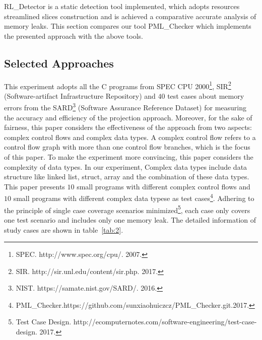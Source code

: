 RL\_Detector is a static detection tool implemented, which adopts resources streamlined slices construction and is achieved a comparative accurate analysis of memory leaks. This section compares our tool PML\_Checker which implements the presented approach with the above tools.
\subsection{Selected Approaches}\label{ssec:ca}
This experiment adopts all the C programs from SPEC CPU 2000\footnote{SPEC. http://www.spec.org/cpu/. 2007.}, SIR\footnote{SIR. http://sir.unl.edu/content/sir.php. 2017.} (Software-artifact Infrastructure Repository) and $40$ test cases about memory errors from the SARD\footnote{NIST. https://samate.nist.gov/SARD/. 2016.} (Software Assurance Reference Dataset) for measuring the accuracy and efficiency of the projection approach. Moreover, for the sake of fairness, this paper considers the effectiveness of the approach from two aspects: complex control flows and complex data types. A complex control flow refers to a control flow graph with more than one control flow branches, which is the focus of this paper. To make the experiment more convincing, this paper considers the complexity of data types. In our experiment, Complex data types include data structure like linked list, struct, array and the combination of these data types. This paper presents $10$ small programs with different complex control flows and $10$ small programs with different complex data typese as test cases\protect\footnote{PML\_Checker.https://github.com/sunxiaohuiczcz/PML\_Checker.git.2017.}. Adhering to the principle of single case coverage scenarios minimized\footnote{Test Case Design. http://ecomputernotes.com/software-engineering/test-case-design. 2017.}, each case only covers one test scenario and includes only one memory leak.
The detailed information of study cases are shown in table~\ref{tab:2}.
%
